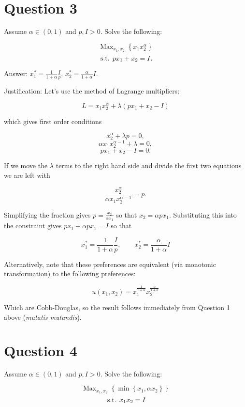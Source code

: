 \documentclass{article}
\newenvironment{solution}{\color{red}}{\color{black}}
\DeclareMathOperator*{\Max}{Max}
\newcommand{\st}{\hbox{ s.t. }}
\begin{document}
\section*{Question 3}
Assume $\alpha \in (0,1)$ and $p, I >0$. Solve the following:

\[ \Max_{x_1, x_2} \left\{ x_1 x_2^\alpha \right\} \]
\[ \st p x_1 + x_2 =I. \]

\begin{solution}
Answer: $x_1^* = \frac1{1+\alpha}\frac{I}{p}$, $x_2^* =  \frac{\alpha}{1+\alpha} I$.

Justification: 
Let's use the method of Lagrange multipliers:

\[ L = x_1 x_2^\alpha + \lambda( p x_1 + x_2 - I) \]

which gives first order conditions

\[ x_2^\alpha + \lambda p = 0, \]
\[ \alpha x_1 x_2^{\alpha -1} + \lambda = 0, \]
\[ p x_1 + x_2 - I = 0. \]

If we move the $\lambda$ terms to the right hand side and divide the first two equations we are left with

\[ \frac{x_2^\alpha}{\alpha x_1 x_2^{\alpha -1}} = p. \]

Simplifying the fraction gives $p = \frac{x_2}{\alpha x_1}$ so that $x_2 = \alpha p x_1$. Substituting this into the constraint gives $ p x_1 + \alpha p x_1 = I$ so that 

\[ x_1^* = \frac1{1+\alpha}\frac{I}{p}, \qquad x_2^* =  \frac{\alpha}{1+\alpha} I \]

Alternatively, note that these preferences are equivalent (via monotonic transformation) to the following preferences:

\[ u(x_1, x_2) = x_1^\frac{1}{1+\alpha} x_2^\frac{\alpha}{1+\alpha} \]

Which are Cobb-Douglas, so the result follows immediately from Question 1 above (\textit{mutatis mutandis}).

\end{solution}

\section*{Question 4}
Assume $\alpha \in (0,1)$ and $p, I >0$. Solve the following:

\[ \Max_{x_1, x_2} \left\{ \min \left\{x_1, \alpha x_2 \right\} \right\} \]
\[ \st  x_1x_2 = I \]
\end{document}
